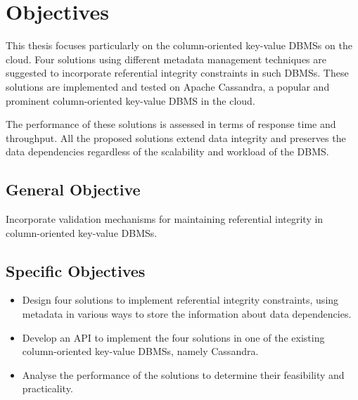 \section{Objectives} 

This thesis  focuses particularly on the column-oriented key-value \acp{DBMS} on
the cloud.  Four  solutions using different metadata management techniques are
suggested to incorporate referential integrity constraints in such \acp{DBMS}. 
These solutions are implemented and tested on Apache Cassandra, a popular and
prominent column-oriented key-value \ac{DBMS}  in the cloud.

The performance of these solutions is assessed  in terms of response time and
throughput.  All the proposed solutions extend data integrity and  preserves the
data dependencies regardless of the scalability and workload of the \ac{DBMS}.

\subsection{General Objective}
 Incorporate validation mechanisms for maintaining referential integrity in
 column-oriented key-value \acp{DBMS}.

\subsection{Specific Objectives}
	\begin{itemize} 
	  \item Design four solutions to implement referential integrity constraints,
	  using metadata in various ways to store the information about data
	  dependencies. 
	  \item Develop an \ac{API}  to implement the four solutions in one of the
	  existing column-oriented key-value \acp{DBMS}, namely Cassandra.  
	  \item Analyse the performance of the solutions to determine their
	   feasibility and practicality. 
	\end{itemize} 


